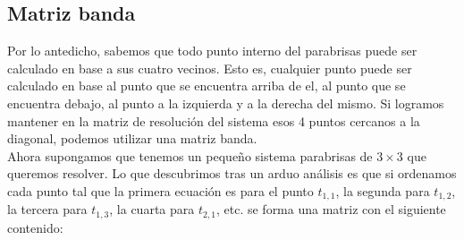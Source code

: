 \subsection{Matriz banda}

Por lo antedicho, sabemos que todo punto interno del parabrisas puede ser calculado en base a sus cuatro vecinos. Esto es, cualquier punto puede ser calculado en base al punto que se encuentra arriba de el, al punto que se encuentra debajo, al punto a la izquierda y a la derecha del mismo. Si logramos mantener en la matriz de resolución del sistema esos 4 puntos cercanos a la diagonal, podemos utilizar una matriz banda.
\\
Ahora supongamos que tenemos un pequeño sistema parabrisas de $3 \times 3$ que queremos resolver. Lo que descubrimos tras un arduo análisis es que si ordenamos cada punto tal que la primera ecuación es para el punto $t_{1,1}$, la segunda para $t_{1,2}$, la tercera para $t_{1,3}$, la cuarta para $t_{2,1}$, etc. se forma una matriz con el siguiente contenido:

\setcounter{MaxMatrixCols}{30}

